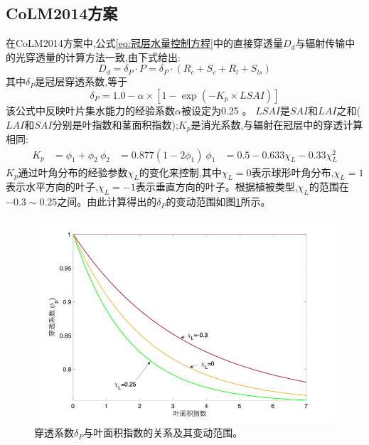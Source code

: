 \subsection{CoLM2014方案}
在CoLM2014方案中,公式\ref{eq:冠层水量控制方程}中的直接穿透量$D_d$与辐射传输中的光穿透量的计算方法一致,由下式给出:
\begin{equation}
D_{d}=\delta_{P} \cdot P=\delta_{P} \cdot\left(R_{c}+S_{c}+R_{l}+S_{l s}\right)
\end{equation}
其中$\delta_P$是冠层穿透系数,等于
\begin{equation}
\delta_{P}=1.0-\alpha \times\left[1-\exp \left(-K_{p} \times LSAI\right)\right]
\end{equation}
该公式中反映叶片集水能力的经验系数$\alpha$被设定为0.25 \citep{lawrence2011parameterization}。
$LSAI$是$SAI$和$LAI$之和($LAI$和$SAI$分别是叶指数和茎面积指数);$K_p$是消光系数,与辐射在冠层中的穿透计算相同:
\begin{equation}\label{eq:消光系数}
\begin{aligned}
K_{p} &= \phi_{1}+\phi_{2} \
\phi_{2} &= 0.877\left(1-2 \phi_{1}\right) \
\phi_{1} &= 0.5-0.633 \chi_{L}-0.33 \chi_{L}^{2}
\end{aligned}
\end{equation}
$K_p$通过叶角分布的经验参数$\chi_L$的变化来控制,其中$\chi_L=0$表示球形叶角分布,$\chi_L= 1$表示水平方向的叶子,$\chi_L= -1$表示垂直方向的叶子。根据植被类型,$\chi_L$的范围在$-0.3\sim0.25$之间。由此计算得出的$\delta_P$的变动范围如图\ref{fig:穿透系数与叶面积指数}所示。
\begin{figure}[htbp]
\centering
\includegraphics{Figures/陆地表面的水分循环/穿透系数与叶面积指数.png}
\caption{穿透系数$\delta_P$与叶面积指数的关系及其变动范围。}
\label{fig:穿透系数与叶面积指数}
\end{figure}

